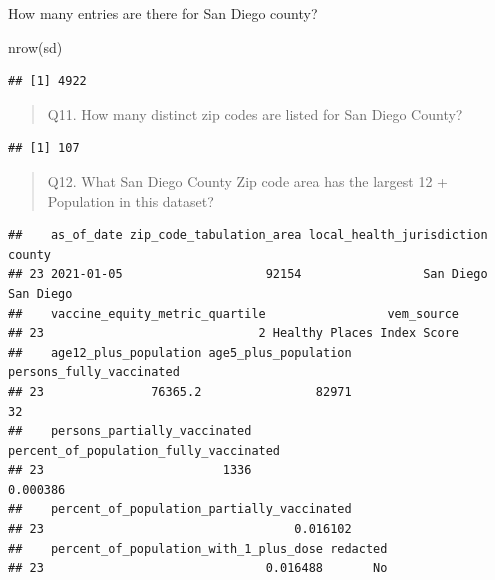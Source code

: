 \documentclass[
]{article}
\newenvironment{Shaded}{\begin{snugshade}}{\end{snugshade}}
\newcommand{\FunctionTok}[1]{\textcolor[rgb]{0.00,0.00,0.00}{#1}}
\newcommand{\NormalTok}[1]{#1}
\newcommand{\OtherTok}[1]{\textcolor[rgb]{0.56,0.35,0.01}{#1}}
\newcommand{\SpecialCharTok}[1]{\textcolor[rgb]{0.00,0.00,0.00}{#1}}
\begin{document}
How many entries are there for San Diego county?

\begin{Shaded}
\begin{Highlighting}[]
\FunctionTok{nrow}\NormalTok{(sd)}
\end{Highlighting}
\end{Shaded}

\begin{verbatim}
## [1] 4922
\end{verbatim}

\begin{quote}
Q11. How many distinct zip codes are listed for San Diego County?
\end{quote}

\begin{Shaded}
\end{Shaded}

\begin{verbatim}
## [1] 107
\end{verbatim}

\begin{quote}
Q12. What San Diego County Zip code area has the largest 12 + Population
in this dataset?
\end{quote}

\begin{Shaded}
\end{Shaded}

\begin{verbatim}
##    as_of_date zip_code_tabulation_area local_health_jurisdiction    county
## 23 2021-01-05                    92154                 San Diego San Diego
##    vaccine_equity_metric_quartile                 vem_source
## 23                              2 Healthy Places Index Score
##    age12_plus_population age5_plus_population persons_fully_vaccinated
## 23               76365.2                82971                       32
##    persons_partially_vaccinated percent_of_population_fully_vaccinated
## 23                         1336                               0.000386
##    percent_of_population_partially_vaccinated
## 23                                   0.016102
##    percent_of_population_with_1_plus_dose redacted
## 23                               0.016488       No
\end{verbatim}
\end{document}
